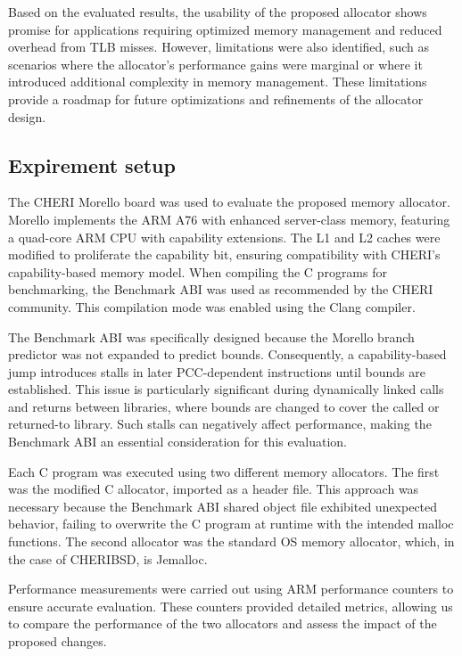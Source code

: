 \documentclass[11pt]{article}
\begin{document}
Based on the evaluated results, the usability of the proposed allocator shows promise 
for applications requiring optimized memory management and reduced overhead from TLB misses.
However, limitations were also identified, such as scenarios where the allocator's performance 
gains were marginal or where it introduced additional complexity in memory management. These 
limitations provide a roadmap for future optimizations and refinements of the allocator design.

\subsection{Expirement setup}
\label{sec:orgeb993d4}

The CHERI Morello\cite{Morello} board was used to evaluate the proposed memory allocator. 
Morello implements the ARM A76 with enhanced server-class memory, featuring a 
quad-core ARM CPU with capability extensions. The L1 and L2 caches were modified 
to proliferate the capability bit, ensuring compatibility with CHERI's capability-based 
memory model. When compiling the C programs for benchmarking, the Benchmark ABI was 
used as recommended by the CHERI community. This compilation mode was enabled using 
the Clang compiler.

The Benchmark ABI\cite{BenchmarkABI} was specifically designed because the Morello branch predictor 
was not expanded to predict bounds. Consequently, a capability-based jump introduces 
stalls in later PCC-dependent instructions until bounds are established. This issue 
is particularly significant during dynamically linked calls and returns between 
libraries, where bounds are changed to cover the called or returned-to library. 
Such stalls can negatively affect performance, making the Benchmark ABI an essential 
consideration for this evaluation.

Each C program was executed using two different memory allocators. The first was 
the modified C allocator, imported as a header file. This approach was necessary 
because the Benchmark ABI shared object file exhibited unexpected behavior, 
failing to overwrite the C program at runtime with the intended malloc functions. 
The second allocator was the standard OS memory allocator, which, in the case of
CHERIBSD, is Jemalloc.

Performance measurements were carried out using ARM performance counters\cite{PerformanceCounter} to 
ensure accurate evaluation. These counters provided detailed metrics, allowing 
us to compare the performance of the two allocators and assess the impact of 
the proposed changes.
\end{document}
